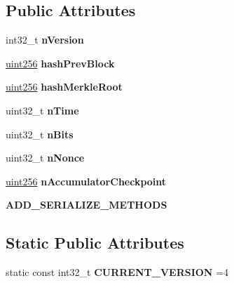 \subsection*{Public Attributes}
\begin{DoxyCompactItemize}
\item 
\mbox{\label{class_c_block_header_ad64b7a76914741861f55f0f38ed66fb5}} 
int32\+\_\+t {\bfseries n\+Version}
\item 
\mbox{\label{class_c_block_header_ad9b904df502d648309342e5e5b0949a6}} 
\mbox{\hyperlink{classuint256}{uint256}} {\bfseries hash\+Prev\+Block}
\item 
\mbox{\label{class_c_block_header_ae9ef013abbcfbd9f8bc23dbcda0fd5af}} 
\mbox{\hyperlink{classuint256}{uint256}} {\bfseries hash\+Merkle\+Root}
\item 
\mbox{\label{class_c_block_header_aa435a58a8f13a304681e797366e0d56d}} 
uint32\+\_\+t {\bfseries n\+Time}
\item 
\mbox{\label{class_c_block_header_a88d501b1da4d34d7dc80c65bd4837670}} 
uint32\+\_\+t {\bfseries n\+Bits}
\item 
\mbox{\label{class_c_block_header_a3826d43cd36673027e17ecc674450e71}} 
uint32\+\_\+t {\bfseries n\+Nonce}
\item 
\mbox{\label{class_c_block_header_a9b4db9d8346617d609e8a47125d163a8}} 
\mbox{\hyperlink{classuint256}{uint256}} {\bfseries n\+Accumulator\+Checkpoint}
\item 
\mbox{\label{class_c_block_header_abddc9307695fbe6bd9bb1a7f48d38011}} 
{\bfseries A\+D\+D\+\_\+\+S\+E\+R\+I\+A\+L\+I\+Z\+E\+\_\+\+M\+E\+T\+H\+O\+DS}
\end{DoxyCompactItemize}
\subsection*{Static Public Attributes}
\begin{DoxyCompactItemize}
\item 
\mbox{\label{class_c_block_header_a1da5740e22d124df509383a1ff96eb7c}} 
static const int32\+\_\+t {\bfseries C\+U\+R\+R\+E\+N\+T\+\_\+\+V\+E\+R\+S\+I\+ON} =4
\end{DoxyCompactItemize}


